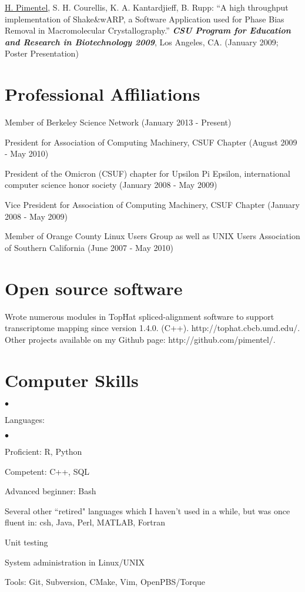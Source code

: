 \documentclass[margin,line]{res}
\newenvironment{list2}{
  \begin{list}{$\bullet$}{%
      \setlength{\itemsep}{0in}
      \setlength{\parsep}{0in} \setlength{\parskip}{0in}
      \setlength{\topsep}{0in} \setlength{\partopsep}{0in}
      \setlength{\leftmargin}{0.2in}}}{\end{list}}
\begin{document}
\begin{resume}
\underline{H. Pimentel}, S. H. Courellis, K. A. Kantardjieff, B. Rupp:
``A high throughput implementation of Shake\&wARP, a Software
Application used for Phase Bias Removal in Macromolecular
Crystallography.'' {\bf \emph{CSU Program for Education and Research
   in Biotechnology 2009}}, Los Angeles, CA. (January 2009; Poster Presentation)


\section{\sc Professional Affiliations}
Member of Berkeley Science Network
(January 2013 - Present)

President for Association of Computing Machinery, CSUF Chapter
(August 2009 - May 2010)

President of the Omicron (CSUF) chapter for Upsilon Pi Epsilon,
international computer science honor society (January 2008 - May 2009)

Vice President for Association of Computing Machinery, CSUF Chapter
(January 2008 - May 2009)

Member of Orange County Linux Users Group as well as UNIX Users
Association of Southern California (June 2007 - May 2010)

\section{\sc Open source software}
Wrote numerous modules in TopHat spliced-alignment software to support
transcriptome mapping since version 1.4.0. (C++). http://tophat.cbcb.umd.edu/.
Other projects available on my Github page: http://github.com/pimentel/.

\newpage
\section{\sc Computer Skills}
\begin{list2}
\item Languages:
  \begin{list2}
    \item Proficient: R, Python
    \item Competent: C++, SQL
    \item Advanced beginner: Bash
  \end{list2}
\item Several other ``retired" languages which I haven't used in a while,
  but was once fluent in: csh, Java, Perl, MATLAB, Fortran
\item Unit testing
\item System administration in Linux/UNIX
\item Tools: Git, Subversion, CMake, Vim, OpenPBS/Torque\\
\end{list2}
\vspace{-.65cm}


\end{resume}
\end{document}
